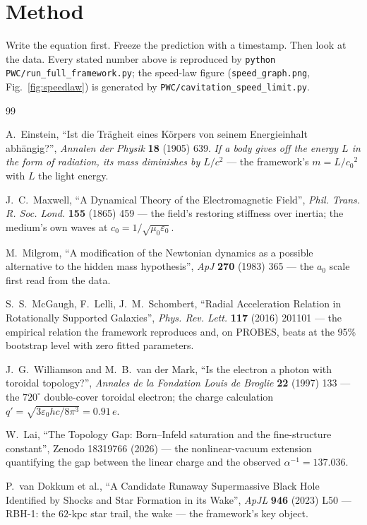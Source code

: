 \documentclass[11pt, a4paper]{article}
\newcommand{\cnot}{\ensuremath{c_0}}
\begin{document}
\section{Method}
Write the equation first. Freeze the prediction with a timestamp. Then look at
the data. Every stated number above is reproduced by
\texttt{python PWC/run\_full\_framework.py}; the speed-law figure
(\texttt{speed\_graph.png}, Fig.~\ref{fig:speedlaw}) is generated by
\texttt{PWC/cavitation\_speed\_limit.py}.

\begin{thebibliography}{99}

 A.~Einstein, ``Ist die Tr\"agheit eines K\"orpers von
seinem Energieinhalt abh\"angig?'', \emph{Annalen der Physik} \textbf{18} (1905)
639. \emph{If a body gives off the energy $L$ in the form of radiation, its mass
diminishes by $L/c^2$} --- the framework's $m = L/\cnot^2$ with $L$ the light
energy.

 J.~C.~Maxwell, ``A Dynamical Theory of the Electromagnetic
Field'', \emph{Phil. Trans. R. Soc. Lond.} \textbf{155} (1865) 459 --- the
field's restoring stiffness over inertia; the medium's own waves at
$\cnot = 1/\sqrt{\mu_0\varepsilon_0}$.

 M.~Milgrom, ``A modification of the Newtonian dynamics as
a possible alternative to the hidden mass hypothesis'', \emph{ApJ} \textbf{270}
(1983) 365 --- the $a_0$ scale first read from the data.

 S.~S.~McGaugh, F.~Lelli, J.~M.~Schombert, ``Radial
Acceleration Relation in Rotationally Supported Galaxies'', \emph{Phys. Rev.
Lett.} \textbf{117} (2016) 201101 --- the empirical relation the framework
reproduces and, on PROBES, beats at the 95\% bootstrap level with zero fitted
parameters.

 J.~G.~Williamson and M.~B.~van der Mark, ``Is the
electron a photon with toroidal topology?'', \emph{Annales de la Fondation Louis
de Broglie} \textbf{22} (1997) 133 --- the $720^\circ$ double-cover toroidal
electron; the charge calculation $q' = \sqrt{3\varepsilon_0 hc/8\pi^3} =
0.91\,e$.

 W.~Lai, ``The Topology Gap: Born--Infeld saturation and the
fine-structure constant'', Zenodo 18319766 (2026) --- the nonlinear-vacuum
extension quantifying the gap between the linear charge and the observed
$\alpha^{-1} = 137.036$.

 P.~van Dokkum et al., ``A Candidate Runaway Supermassive
Black Hole Identified by Shocks and Star Formation in its Wake'',
\emph{ApJL} \textbf{946} (2023) L50 --- RBH-1: the $62$-kpc star trail, the
wake --- the framework's key object.


\end{thebibliography}
\end{document}
